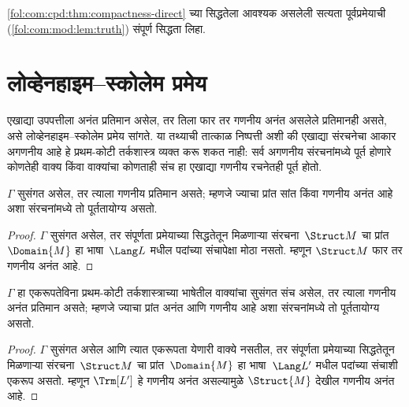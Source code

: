 \begin{prob}
\ref{fol:com:cpd:thm:compactness-direct} च्या सिद्धतेला आवश्यक असलेली
सत्यता पूर्वप्रमेयाची (\ref{fol:com:mod:lem:truth}) संपूर्ण सिद्धता
लिहा.
\end{prob}














\section{लोव्हेनहाइम--स्कोलेम प्रमेय}\label{fol:com:dls:sec}

एखाद्या उपपत्तीला अनंत प्रतिमान असेल, तर तिला फार तर गणनीय अनंत
असलेले प्रतिमानही असते, असे लोव्हेनहाइम--स्कोलेम प्रमेय सांगते. या
तथ्याची तात्काळ निष्पत्ती अशी की एखाद्या संरचनेचा आकार
अगणनीय आहे हे प्रथम-कोटी तर्कशास्त्र व्यक्त करू शकत नाही: सर्व
अगणनीय संरचनांमध्ये पूर्त होणारे कोणतेही वाक्य
किंवा वाक्यांचा कोणताही संच हा एखाद्या गणनीय रचनेतही
पूर्त होतो.

\begin{thm}
\label{fol:com:dls:thm:downward-ls} $\Gamma$ सुसंगत असेल, तर त्याला
गणनीय प्रतिमान असते; म्हणजे ज्याचा प्रांत सांत किंवा
गणनीय अनंत आहे अशा संरचनांमध्ये तो पूर्ततायोग्य असतो.
\end{thm}

\begin{proof}
$\Gamma$ सुसंगत असेल, तर संपूर्णता प्रमेयाच्या सिद्धतेतून मिळणाऱ्या
संरचना~$\Struct M$ चा प्रांत~$\Domain{M}$ हा भाषा~$\Lang L$ मधील
पदांच्या संचापेक्षा मोठा नसतो. म्हणून $\Struct M$ फार तर
गणनीय अनंत आहे.
\end{proof}

\begin{thm}
\label{fol:com:dls:noidentity-ls} $\Gamma$ हा एकरूपतेविना प्रथम-कोटी तर्कशास्त्राच्या
भाषेतील वाक्यांचा सुसंगत संच असेल, तर त्याला गणनीय अनंत
प्रतिमान असते; म्हणजे ज्याचा प्रांत अनंत आणि गणनीय आहे अशा
संरचनांमध्ये तो पूर्ततायोग्य असतो.
\end{thm}

\begin{proof}
$\Gamma$ सुसंगत असेल आणि त्यात एकरूपता येणारी वाक्ये नसतील, तर संपूर्णता
प्रमेयाच्या सिद्धतेतून मिळणाऱ्या संरचना~$\Struct M$ चा
प्रांत~$\Domain{M}$ हा भाषा~$\Lang L'$ मधील पदांच्या संचाशी एकरूप असतो.
म्हणून $\Trm[L']$ हे गणनीय अनंत असल्यामुळे $\Struct{M}$ देखील
गणनीय अनंत आहे.
\end{proof}

